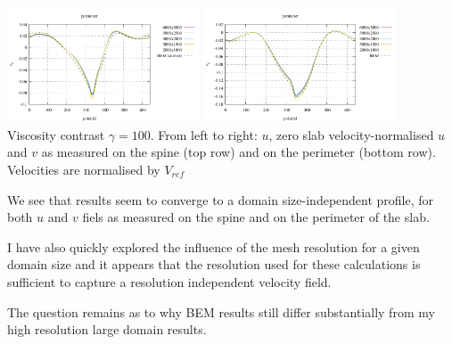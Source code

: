 \begin{center}
\includegraphics[width=5.7cm]{python_codes/fieldstone_55/gamma100/vx_perimeter2}
\includegraphics[width=5.7cm]{python_codes/fieldstone_55/gamma100/vy_perimeter}\\
{\captionfont Viscosity contrast $\gamma=100$. From left to right: $u$, zero slab velocity-normalised $u$ 
and $v$ as measured on the spine (top row) and on the perimeter (bottom row). Velocities are normalised by $V_{ref}$}
\end{center}

We see that results seem to converge to a domain size-independent profile, for both $u$ and $v$
fiels as measured on the spine and on the perimeter of the slab. 

I have also quickly explored the influence of the mesh resolution for a given domain size 
and it appears that the resolution used for these calculations is sufficient to capture 
a resolution independent velocity field.

The question remains as to why BEM results still differ substantially from my high resolution
large domain results.






\newpage
